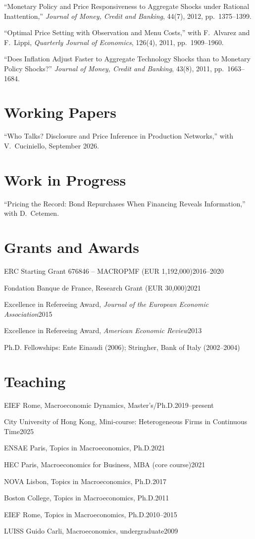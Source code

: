 \documentclass[11pt]{article}
\newcommand{\entry}[2]{\noindent #1\hfill #2\par}
\newenvironment{pubs}{\begin{list}{}{\setlength{\leftmargin}{1.5em}\setlength{\itemindent}{-1.5em}\setlength{\itemsep}{0.35em}\setlength{\parsep}{0pt}\setlength{\topsep}{0.2em}}}{\end{list}}
\begin{document}
\begin{pubs}
\item ``Monetary Policy and Price Responsiveness to Aggregate Shocks under Rational Inattention,'' \emph{Journal of Money, Credit and Banking}, 44(7), 2012, pp.~1375--1399.
\item ``Optimal Price Setting with Observation and Menu Costs,'' with F.~Alvarez and F.~Lippi, \emph{Quarterly Journal of Economics}, 126(4), 2011, pp.~1909--1960.
\item ``Does Inflation Adjust Faster to Aggregate Technology Shocks than to Monetary Policy Shocks?'' \emph{Journal of Money, Credit and Banking}, 43(8), 2011, pp.~1663--1684.
\end{pubs}

\section{Working Papers}
\begin{pubs}
\item ``Who Talks? Disclosure and Price Inference in Production Networks,'' with V.~Cuciniello, September 2026.
\end{pubs}

\section{Work in Progress}
\begin{pubs}
\item ``Pricing the Record: Bond Repurchases When Financing Reveals Information,'' with D.~Cetemen.
\end{pubs}

\section{Grants and Awards}
\entry{ERC Starting Grant 676846 -- MACROPMF (EUR 1,192,000)}{2016--2020}
\entry{Fondation Banque de France, Research Grant (EUR 30,000)}{2021}
\entry{Excellence in Refereeing Award, \emph{Journal of the European Economic Association}}{2015}
\entry{Excellence in Refereeing Award, \emph{American Economic Review}}{2013}
\entry{Ph.D. Fellowships: Ente Einaudi (2006); Stringher, Bank of Italy (2002--2004)}{}

\section{Teaching}
\entry{EIEF Rome, Macroeconomic Dynamics, Master's/Ph.D.}{2019--present}
\entry{City University of Hong Kong, Mini-course: Heterogeneous Firms in Continuous Time}{2025}
\entry{ENSAE Paris, Topics in Macroeconomics, Ph.D.}{2021}
\entry{HEC Paris, Macroeconomics for Business, MBA (core course)}{2021}
\entry{NOVA Lisbon, Topics in Macroeconomics, Ph.D.}{2017}
\entry{Boston College, Topics in Macroeconomics, Ph.D.}{2011}
\entry{EIEF Rome, Topics in Macroeconomics, Ph.D.}{2010--2015}
\entry{LUISS Guido Carli, Macroeconomics, undergraduate}{2009}
\end{document}
